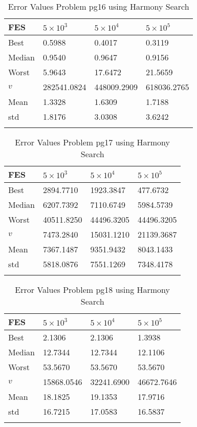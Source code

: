\documentclass[10pt, a4paper]{book}
\begin{document}
\begin{center}
\begin{longtable}{l l l l}
FES & $5 \times 10^{3}$ & $5 \times 10^{4}$ & $5 \times 10^{5}$ \\
\hline
Best & 0.5988 & 0.4017 & 0.3119 \\
Median & 0.9540 & 0.9647 & 0.9156 \\
Worst & 5.9643 & 17.6472 & 21.5659 \\
$v$ & 282541.0824 & 448009.2909 & 618036.2765 \\
Mean & 1.3328 & 1.6309 & 1.7188 \\
std & 1.8176 & 3.0308 & 3.6242 \\
\caption{ Error Values Problem pg16 using Harmony Search }
\end{longtable}
\end{center}

\begin{center}
\begin{longtable}{l l l l}
FES & $5 \times 10^{3}$ & $5 \times 10^{4}$ & $5 \times 10^{5}$ \\
\hline
Best & 2894.7710 & 1923.3847 & 477.6732 \\
Median & 6207.7392 & 7110.6749 & 5984.5739 \\
Worst & 40511.8250 & 44496.3205 & 44496.3205 \\
$v$ & 7473.2840 & 15031.1210 & 21139.3687 \\
Mean & 7367.1487 & 9351.9432 & 8043.1433 \\
std & 5818.0876 & 7551.1269 & 7348.4178 \\
\caption{ Error Values Problem pg17 using Harmony Search }
\end{longtable}
\end{center}

\begin{center}
\begin{longtable}{l l l l}
FES & $5 \times 10^{3}$ & $5 \times 10^{4}$ & $5 \times 10^{5}$ \\
\hline
Best & 2.1306 & 2.1306 & 1.3938 \\
Median & 12.7344 & 12.7344 & 12.1106 \\
Worst & 53.5670 & 53.5670 & 53.5670 \\
$v$ & 15868.0546 & 32241.6900 & 46672.7646 \\
Mean & 18.1825 & 19.1353 & 17.9716 \\
std & 16.7215 & 17.0583 & 16.5837 \\
\caption{ Error Values Problem pg18 using Harmony Search }
\end{longtable}
\end{center}
\end{document}
